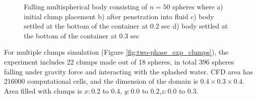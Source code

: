\begin{figure}[!ht]
\begin{minipage}{.5\textwidth}
    \end{minipage}
    \caption{Falling multispherical body consisting of $n = 50$ spheres where a) initial clump placement b) after penetration into fluid c) body settled at the bottom of the container at 0.2 sec d) body settled at the bottom of the container at 0.3 sec}
    \label{fig:two-phase_exp}
\end{figure}

For multiple clumps simulation (Figure \ref{fig:two-phase_exp_clumps}), the experiment includes 22 clumps made out of 18 spheres, in total 396 spheres falling under gravity force and interacting with the splashed water. CFD area has 216000 computational cells, and the dimension of the domain is $0.4\times 0.3\times0.4$. Area filled with clumps is $x:0.2$ to $0.4$, $y: 0.0$ to $ 0.2$,$ z:0.0$ to $ 0.3$.
